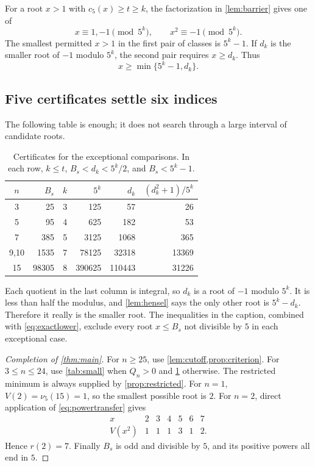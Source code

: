 \documentclass[11pt,a4paper]{article}
\theoremstyle{definition}
\begin{document}
For a root $x>1$ with $c_5(x)\ge t\ge k$, the factorization in
\cref{lem:barrier} gives one of
\begin{equation}
x\equiv1,-1\pmod{5^k},\qquad x^2\equiv-1\pmod{5^k}.
\label{eq:fourclasses}
\end{equation}
The smallest permitted $x>1$ in the first pair of classes is $5^k-1$.
If $d_k$ is the smaller root of $-1$ modulo $5^k$, the second pair
requires $x\ge d_k$. Thus
\begin{equation}
x\ge\min\{5^k-1,d_k\}.
\label{eq:exactlower}
\end{equation}

\subsection{Five certificates settle six indices}
The following table is enough; it does not search through a large
interval of candidate roots.
\begin{table}[H]
\centering
\small
\begin{tabular}{crrrrr}
\toprule
$n$&$B_s$&$k$&$5^k$&$d_k$&$(d_k^2+1)/5^k$\\
\midrule
3&25&3&125&57&26\\
5&95&4&625&182&53\\
7&385&5&3125&1068&365\\
9,10&1535&7&78125&32318&13369\\
15&98305&8&390625&110443&31226\\
\bottomrule
\end{tabular}
\caption{Certificates for the exceptional comparisons. In each row,
$k\le t$, $B_s<d_k<5^k/2$, and $B_s<5^k-1$.}
\label{tab:certs}
\end{table}
Each quotient in the last column is integral, so $d_k$ is a root of
$-1$ modulo $5^k$. It is less than half the modulus, and
\cref{lem:hensel} says the only other root is $5^k-d_k$. Therefore it
really is the smaller root. The inequalities in the caption, combined
with \eqref{eq:exactlower}, exclude every root $x\le B_s$ not divisible
by $5$ in each exceptional case.

\begin{proof}[Completion of \cref{thm:main}]
For $n\ge25$, use \cref{lem:cutoff,prop:criterion}. For $3\le n\le24$,
use \cref{tab:small} when $Q_n>0$ and \cref{tab:certs} otherwise. The
restricted minimum is always supplied by \cref{prop:restricted}.
For $n=1$, $V(2)=\nu_5(15)=1$, so the smallest possible root is $2$.
For $n=2$, direct application of \eqref{eq:powertransfer} gives
\[
\begin{array}{c|rrrrrr}
x&2&3&4&5&6&7\\ \hline
V(x^2)&1&1&1&3&1&2.
\end{array}
\]
Hence $r(2)=7$. Finally $B_s$ is odd and divisible by $5$, and its positive
powers all end in $5$.
\end{proof}
\end{document}
